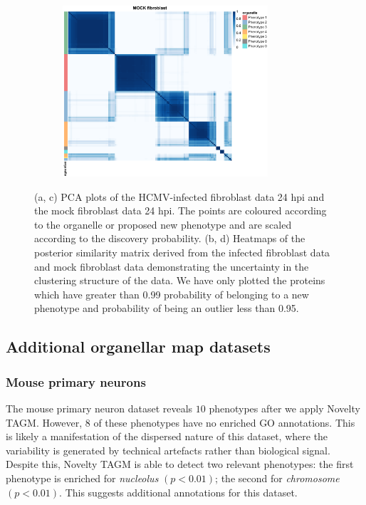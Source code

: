 \documentclass[12pt,english]{article}
\begin{document}
\begin{figure}
\begin{subfigure}[t]{0.5\textwidth}
		\centering
		\includegraphics[height=2.5in]{heatmapMOCK.pdf}
		\caption{}
	\end{subfigure}
	\caption{(a, c) PCA plots of the HCMV-infected fibroblast data 24 hpi and the mock fibroblast data 24 hpi. The points are coloured according to the organelle or proposed new phenotype and are scaled according to the discovery probability. (b, d) Heatmaps of the posterior similarity matrix derived from the infected fibroblast data and mock fibroblast data demonstrating the uncertainty in the clustering structure of the data. We have only plotted the proteins which have greater than 0.99 probability of belonging to a new phenotype and probability of being an outlier less than 0.95.}
	\label{figure:Beltran}
\end{figure}
\subsection{Additional organellar map datasets}\label{supplement:DOM}
\subsubsection{Mouse primary neurons}
The mouse primary neuron dataset reveals $10$ phenotypes after we apply Novelty TAGM. However, $8$ of these phenotypes have no enriched GO annotations. This is likely a manifestation of the dispersed nature of this dataset, where the variability is generated by technical artefacts rather than biological signal. Despite this, Novelty TAGM is able to detect two relevant phenotypes: the first phenotype is enriched for \textit{nucleolus} $(p < 0.01)$; the second for \textit{chromosome} $(p < 0.01)$. This suggests additional annotations for this dataset.
\end{document}

